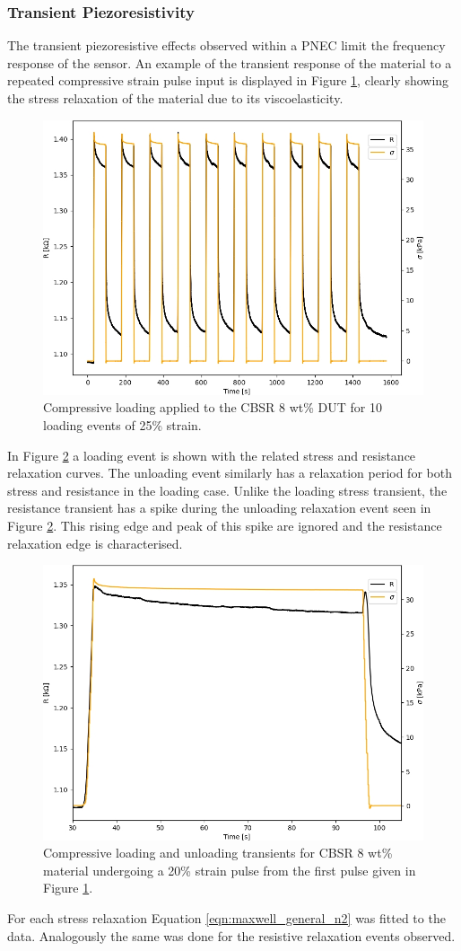 \subsubsection{Transient Piezoresistivity}\label{sec:Transient Piezoresistivity2}
The transient piezoresistive effects observed within a PNEC limit the frequency response of the sensor. An example of the transient response of the material to a repeated compressive strain pulse input is displayed in Figure \ref{fig:stress_seq}, clearly showing the stress relaxation of the material due to its viscoelasticity. 
\begin{figure}[H]
    \centering
    \includegraphics[width=0.7\linewidth]{Figures/CBSR 8 wt 25p strain - 1D test stress seq.jpg}
    \caption{Compressive loading applied to the CBSR 8 wt\% DUT for 10 loading events of 25\% strain.}
    \label{fig:stress_seq}
\end{figure}
In Figure \ref{fig:load_relax_eg} a loading event is shown with the related stress and resistance relaxation curves. The unloading event similarly has a relaxation period for both stress and resistance in the loading case. Unlike the loading stress transient, the resistance transient has a spike during the unloading relaxation event seen in Figure \ref{fig:load_relax_eg}. This rising edge and peak of this spike are ignored and the resistance relaxation edge is characterised.  
\begin{figure}[H]
    \centering
    \includegraphics[width=0.7\linewidth]{Figures/CBSR 8 wt 25p strain - 1D stress load unload.jpg}
    \caption{Compressive loading and unloading transients for CBSR 8 wt\% material undergoing a 20\% strain pulse from the first pulse given in Figure \ref{fig:stress_seq}.}
    \label{fig:load_relax_eg}
\end{figure}
For each stress relaxation Equation \ref{eqn:maxwell_general_n2} was fitted to the data. Analogously the same was done for the resistive relaxation events observed. 

